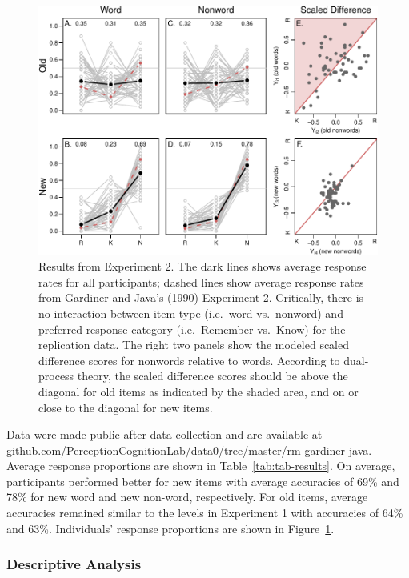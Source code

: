 \documentclass[english,,man]{apa6}
\begin{document}
\begin{figure}
\centering
\includegraphics{p_jou_files/figure-latex/results-2-1.pdf}
\caption{\label{fig:results-2}Results from Experiment 2. The dark lines shows average response rates for all participants; dashed lines show average response rates from Gardiner and Java's (1990) Experiment 2. Critically, there is no interaction between item type (i.e.~word vs.~nonword) and preferred response category (i.e.~Remember vs.~Know) for the replication data. The right two panels show the modeled scaled difference scores for nonwords relative to words. According to dual-process theory, the scaled difference scores should be above the diagonal for old items as indicated by the shaded area, and on or close to the diagonal for new items.}
\end{figure}

Data were made public after data collection and are available at \href{https://github.com/PerceptionCognitionLab/data0/tree/master/rm-gardiner-java}{github.com/PerceptionCognitionLab/data0/tree/master/rm-gardiner-java}.
Average response proportions are shown in Table~\ref{tab:tab-results}. On average, participants performed better for new items with average accuracies of 69\% and 78\% for new word and new non-word, respectively. For old items, average accuracies remained similar to the levels in Experiment 1 with accuracies of 64\% and 63\%. Individuals' response proportions are shown in Figure~\ref{fig:results-2}.

\hypertarget{descriptive-analysis-1}{%
\subsubsection{Descriptive Analysis}\label{descriptive-analysis-1}}
\end{document}

